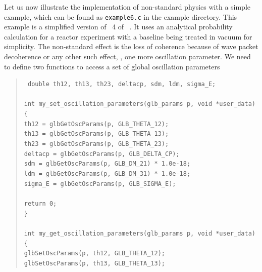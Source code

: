 Let us now illustrate the implementation of non-standard physics with a simple example, which can
be found as {\tt example6.c} in the example directory.
This example is a simplified version of \Sec~4 of 
\Ref~\cite{Blennow:2005yk}.
It uses an analytical probability calculation for a reactor experiment with a baseline being treated
in vacuum for simplicity. The non-standard effect is the loss of coherence because of wave packet decoherence
or any other such effect, \ie, one more oscillation parameter. We need to define two functions to access a set of 
global oscillation parameters
\begin{quote}
{\tt 
double th12, th13, th23, deltacp, sdm, ldm, sigma\_E; \\
\\
int my\_set\_oscillation\_parameters(glb\_params p, void *user\_data) \\
\{ \\
 \hspace*{0.5cm} th12    = glbGetOscParams(p, GLB\_THETA\_12); \\
 \hspace*{0.5cm} th13    = glbGetOscParams(p, GLB\_THETA\_13); \\
 \hspace*{0.5cm} th23    = glbGetOscParams(p, GLB\_THETA\_23); \\
 \hspace*{0.5cm} deltacp = glbGetOscParams(p, GLB\_DELTA\_CP); \\
 \hspace*{0.5cm} sdm     = glbGetOscParams(p, GLB\_DM\_21) * 1.0e-18;  \\
 \hspace*{0.5cm} ldm     = glbGetOscParams(p, GLB\_DM\_31) * 1.0e-18;  \\
 \hspace*{0.5cm} sigma\_E = glbGetOscParams(p, GLB\_SIGMA\_E); \\
\\
  return 0; \\
\} \\
\\
int my\_get\_oscillation\_parameters(glb\_params p, void *user\_data) \\
\{ \\
  \hspace*{0.5cm} glbSetOscParams(p, th12, GLB\_THETA\_12); \\
  \hspace*{0.5cm} glbSetOscParams(p, th13, GLB\_THETA\_13); \\
}
\end{quote}
